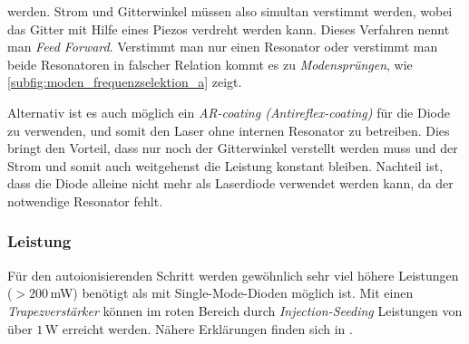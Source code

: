 werden. Strom und Gitterwinkel müssen also simultan verstimmt werden, wobei das
Gitter mit Hilfe eines Piezos verdreht werden kann. Dieses Verfahren nennt
man \textit{Feed Forward}. Verstimmt man nur einen Resonator oder verstimmt
man beide Resonatoren in falscher Relation kommt es zu
\textit{Modensprüngen}, wie \ref{subfig:moden_frequenzselektion_a} zeigt.\par
Alternativ ist es auch möglich ein \textit{AR-coating (Antireflex-coating)} für
die Diode zu verwenden, und somit den Laser ohne internen Resonator zu
betreiben.
Dies bringt den Vorteil, dass nur noch der Gitterwinkel verstellt werden muss
und der Strom und somit auch weitgehenst die Leistung konstant bleiben. Nachteil
ist, dass die Diode alleine nicht mehr als Laserdiode verwendet werden kann, da
der notwendige Resonator fehlt.

\subsubsection{Leistung}\label{subsubsec:diodenlaser_leistung}
Für den autoionisierenden Schritt werden gewöhnlich sehr viel höhere Leistungen
($>200\,$mW) benötigt als mit Single-Mode-Dioden möglich ist. Mit einen
\textit{Trapezverstärker} können im roten Bereich durch
\textit{Injection-Seeding} Leistungen von über $1\,$W erreicht werden. Nähere
Erklärungen finden sich in \cite{schumann:2001:diplomarbeit}.
